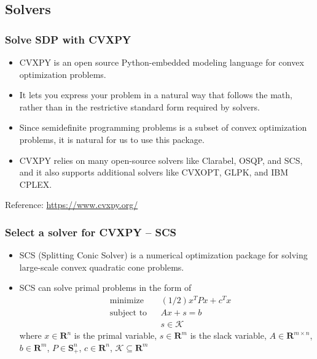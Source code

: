 \documentclass{beamer}
\begin{document}
\subsection{Solvers}
\begin{frame}
  \frametitle{Solve SDP with CVXPY}
  \begin{itemize}
    \item CVXPY is an open source Python-embedded modeling language for
          convex optimization problems.
    \item It lets you express your problem in a natural way that follows
          the math, rather than in the restrictive standard form required
          by solvers.
    \item Since semidefinite programming problems is a subset of convex
          optimization problems, it is natural for us to use this package.
    \item CVXPY relies on many open-source solvers like Clarabel, OSQP, and
          SCS, and it also supports additional solvers like CVXOPT, GLPK,
          and IBM CPLEX.
  \end{itemize}

  \tiny{Reference: \url{https://www.cvxpy.org/}}
\end{frame}

\begin{frame}
  \frametitle{Select a solver for CVXPY -- SCS}
  \begin{itemize}
    \item SCS (Splitting Conic Solver) is a numerical optimization package
          for solving large-scale convex quadratic cone problems.
    \item SCS can solve primal problems in the form of\\
          \begin{align}
             & \text{minimize}   &  & (1/2)x^{T} Px + c^{T}x \\
             & \text{subject to} &  & Ax + s = b             \\
             &                   &  & s \in \mathcal{K}
          \end{align}
          where $x \in \mathbf{R}^{n}$ is the primal variable,
          $s \in \mathbf{R}^{m}$ is the slack variable,
          $A \in \mathbf{R}^{m \times n}$,
          $b \in \mathbf{R}^{m}$,
          $P \in \mathbf{S}^{n}_{+}$,
          $c \in \mathbf{R}^{n}$,
          $\mathcal{K} \subseteq \mathbf{R}^{m}$
  \end{itemize}
\end{frame}
\end{document}
